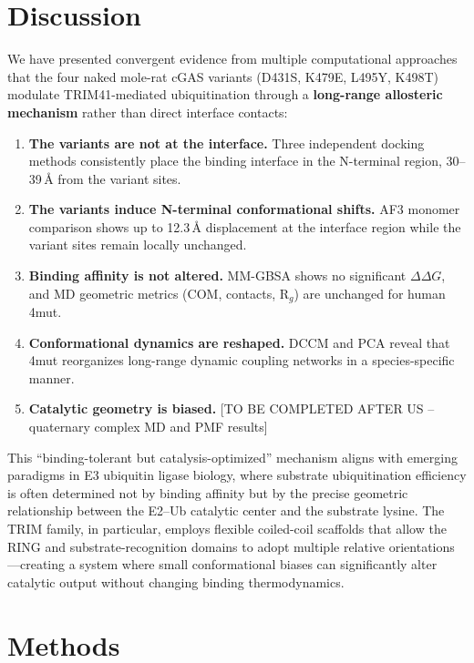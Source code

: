 \documentclass[journal=jcisd8, manuscript=article]{achemso}
\begin{document}
\section{Discussion}

We have presented convergent evidence from multiple computational approaches that the four naked mole-rat cGAS variants (D431S, K479E, L495Y, K498T) modulate TRIM41-mediated ubiquitination through a \textbf{long-range allosteric mechanism} rather than direct interface contacts:

\begin{enumerate}
\item \textbf{The variants are not at the interface.} Three independent docking methods consistently place the binding interface in the N-terminal region, 30--39\,\AA{} from the variant sites.
\item \textbf{The variants induce N-terminal conformational shifts.} AF3 monomer comparison shows up to 12.3\,\AA{} displacement at the interface region while the variant sites remain locally unchanged.
\item \textbf{Binding affinity is not altered.} MM-GBSA shows no significant $\Delta\Delta G$, and MD geometric metrics (COM, contacts, R$_g$) are unchanged for human 4mut.
\item \textbf{Conformational dynamics are reshaped.} DCCM and PCA reveal that 4mut reorganizes long-range dynamic coupling networks in a species-specific manner.
\item \textbf{Catalytic geometry is biased.} [TO BE COMPLETED AFTER US -- quaternary complex MD and PMF results]
\end{enumerate}

This ``binding-tolerant but catalysis-optimized'' mechanism aligns with emerging paradigms in E3 ubiquitin ligase biology, where substrate ubiquitination efficiency is often determined not by binding affinity but by the precise geometric relationship between the E2--Ub catalytic center and the substrate lysine.\cite{pruneda2012,dou2012} The TRIM family, in particular, employs flexible coiled-coil scaffolds that allow the RING and substrate-recognition domains to adopt multiple relative orientations---creating a system where small conformational biases can significantly alter catalytic output without changing binding thermodynamics.

\section{Methods}
\end{document}

